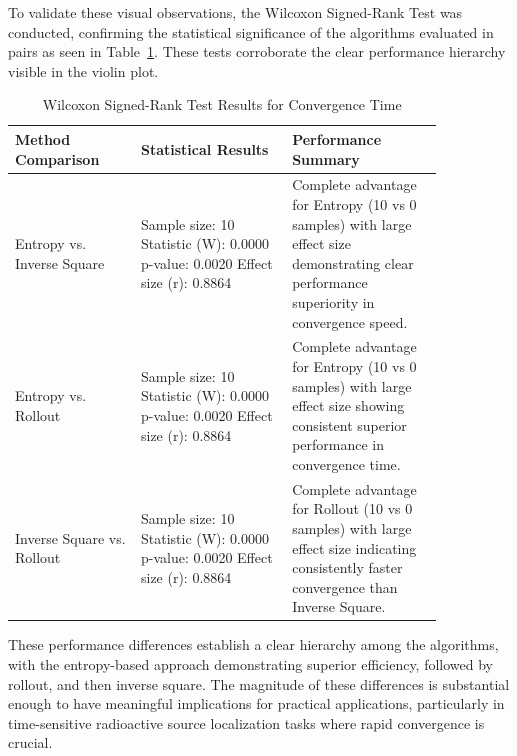 \documentclass[../report.tex]{subfiles}
\begin{document}
    To validate these visual observations, the Wilcoxon Signed-Rank Test was conducted, confirming the statistical significance of the algorithms evaluated in pairs as seen 
    in Table~\ref{tab:wilcoxon_results}. These tests corroborate the clear performance hierarchy visible in the violin plot.
    \begin{table}[ht]
        \caption{Wilcoxon Signed-Rank Test Results for Convergence Time}
        \label{tab:wilcoxon_results}
        \centering
        \begin{tabular}{|p{0.25\linewidth}|p{0.3\linewidth}|p{0.3\linewidth}|}
            \hline
            \rowcolor{gray!10} 
            Method Comparison & Statistical Results & Performance Summary \\
            \hline
            Entropy vs. Inverse Square & 
            Sample size: 10 \newline
            Statistic (W): 0.0000 \newline
            p-value: 0.0020 \newline
            Effect size (r): 0.8864 & 
            Complete advantage for Entropy (10 vs 0 samples) with large effect size demonstrating clear performance superiority in convergence speed. \\
            \hline
            Entropy vs. Rollout & 
            Sample size: 10 \newline
            Statistic (W): 0.0000 \newline
            p-value: 0.0020 \newline
            Effect size (r): 0.8864 & 
            Complete advantage for Entropy (10 vs 0 samples) with large effect size showing consistent superior performance in convergence time. \\
            \hline
            Inverse Square vs. Rollout & 
            Sample size: 10 \newline
            Statistic (W): 0.0000 \newline
            p-value: 0.0020 \newline
            Effect size (r): 0.8864 & 
            Complete advantage for Rollout (10 vs 0 samples) with large effect size indicating consistently faster convergence than Inverse Square. \\
        \hline
        \end{tabular}
    \end{table}

    These performance differences establish a clear hierarchy among the algorithms, with the entropy-based approach demonstrating superior efficiency, followed by 
    rollout, and then inverse square. The magnitude of these differences is substantial enough to have meaningful implications for practical applications, 
    particularly in time-sensitive radioactive source localization tasks where rapid convergence is crucial.
\end{document}
